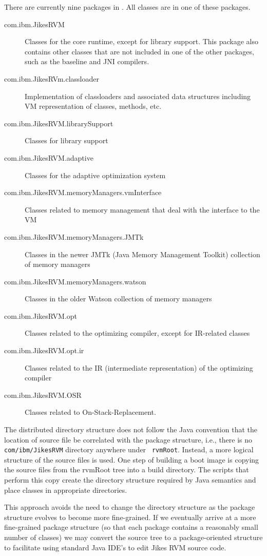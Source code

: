 There are currently nine packages in \jrvm. All classes are in
one of these packages.
\begin{description}
\item [com.ibm.JikesRVM] Classes for the core runtime, except for library
support.  This package also contains other classes that are not
included in one of the other packages, such as the baseline and JNI
compilers. 

\item [com.ibm.JikesRVm.classloader] Implementation of classloaders
and associated data structures including VM representation of classes,
methods, etc. 

\item [com.ibm.JikesRVM.librarySupport] Classes for library support

\item [com.ibm.JikesRVM.adaptive] Classes for the adaptive optimization system

\item [com.ibm.JikesRVM.memoryManagers.vmInterface] Classes related to
memory management that deal with the interface to the VM

\item [com.ibm.JikesRVM.memoryManagers.JMTk] Classes in the newer JMTk
(Java Memory Management Toolkit) collection of memory managers

\item [com.ibm.JikesRVM.memoryManagers.watson] Classes in the older
Watson collection of memory managers

\item [com.ibm.JikesRVM.opt] Classes related to the optimizing
compiler, except for IR-related classes

\item [com.ibm.JikesRVM.opt.ir] Classes related to the IR
(intermediate representation) of the optimizing compiler

\item [com.ibm.JikesRVM.OSR] Classes related to On-Stack-Replacement. 

\end{description}

The distributed directory structure
does not follow the Java convention that the location of source file
be correlated with the package structure, i.e.,
there is no {\tt com/ibm/JikesRVM} directory anywhere under {\tt
rvmRoot}.  Instead, a more logical structure of the source
files is used.  One step of building a boot image
is copying the source files from the rvmRoot tree into a build
directory.  The scripts that perform this copy create the directory
structure required by Java semantics and place classes in appropriate
directories.

This approach avoids the need to change the directory structure as the
package structure evolves to become more fine-grained. If we
eventually arrive at a more fine-grained package structure (so that
each package contains a reasonably small number of classes) we may
convert the source tree to a package-oriented structure to facilitate
using standard Java IDE's to edit Jikes RVM source code.
